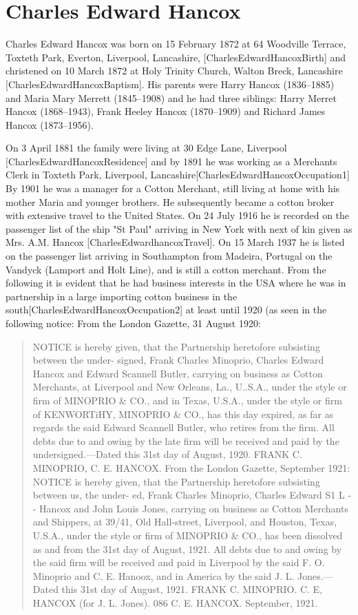 \section{Charles Edward Hancox}\label{Charles_Edward_Hancox}

Charles Edward Hancox was born on 15 February 1872 at 64 Woodville Terrace, Toxteth Park, Everton, Liverpool, Lancashire, [CharlesEdwardHancoxBirth] and christened on 10 March 1872 at Holy Trinity Church, Walton Breck, Lancashire [CharlesEdwardHancoxBaptism]. His parents were Harry Hancox (1836--1885) and Maria Mary Merrett (1845--1908) and he had three siblings: Harry Merret Hancox (1868--1943), Frank Heeley Hancox (1870--1909) and Richard James Hancox (1873--1956).


On 3 April 1881 the family were living at 30 Edge Lane, Liverpool [CharlesEdwardHancoxResidence] and by 1891 he was working as a Merchants Clerk in Toxteth Park, Liverpool, Lancashire[CharlesEdwardHancoxOccupation1]
By 1901 he was a manager for a Cotton Merchant, still living at home with his mother Maria and younger brothers. He subsequently became a cotton broker with extensive travel to the United States.  On 24 July 1916 he is recorded on the passenger list of the ship "St Paul" arriving in New York with next of kin given as Mrs. A.M. Hancox [CharlesEdwardhancoxTravel]. On 15 March 1937 he is listed on the passenger list arriving in Southampton from Madeira, Portugal on the Vandyck (Lamport and Holt Line), and is still a cotton merchant. From the following it is evident that he had business interests in the USA where he was in partnership in a large importing cotton business in the south[CharlesEdwardHancoxOccupation2] at least until 1920 (as seen in the following notice:
From the London Gazette, 31 August 1920:

\begin{quotation}
NOTICE is hereby given, that the Partnership heretofore subsisting between the under- signed, Frank Charles Minoprio, Charles Edward Hancox and Edward Scannell Butler, carrying on business as Cotton Merchants, at Liverpool and New Orleans, La., U..S.A., under the style or firm of MINOPRIO \& CO., and in Texas, U.S.A., under the style or firm of KENWORTiHY, MINOPRIO \& CO., has this day expired, as far as regards the said Edward Scannell Butler, who retires from the firm. All debts due to and owing by the late firm will be received and paid by the undersigned.—Dated this 31st day of August, 1920. FRANK C. MINOPRIO, C. E. HANCOX. From the London Gazette, September 1921: NOTICE is hereby given, that the Partnership heretofore subsisting between us, the under- ed, Frank Charles Minoprio, Charles Edward S1 L - - Hancox and John Louis Jones, carrying on business as Cotton Merchants and Shippers, at 39/41, Old Hall-street, Liverpool, and Houston, Texas, U.S.A., under the style or firm of MINOPRIO \& CO., has been dissolved as and from the 31st day of August, 1921. All debts due to and owing by the said firm will be received and paid in Liverpool by the said F. O. Minoprio and C. E. Hanoox, and in America by the said J. L. Jones.—Dated this 31st day of August, 1921. FRANK C. MINOPRIO. C. E, HANCOX (for J. L. Jones). 086 C. E. HANCOX. September, 1921.
\end{quotation}

